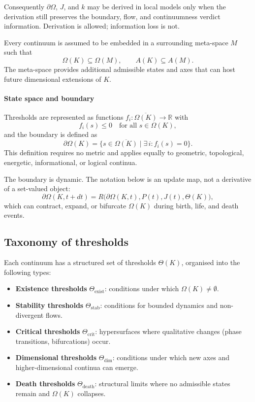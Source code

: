 Consequently \(\partial\Omega\), \(J\), and \(k\) may be derived in local
models only when the derivation still preserves the boundary, flow, and
continuumness verdict information. Derivation is allowed; information loss is
not.

Every continuum is assumed to be embedded in a surrounding meta-space \(M\) such that
\[
    \Omega(K)\subseteq\Omega(M), \qquad A(K)\subseteq A(M).
\]
The meta-space provides additional admissible states and axes that can host future dimensional extensions of \(K\).

\paragraph{State space and boundary}
Thresholds are represented as functions \(f_i : \overline{\Omega(K)} \to \mathbb{R}\) with
\[
    f_i(s) \le 0 \quad\text{for all } s \in \Omega(K),
\]
and the boundary is defined as
\[
    \partial\Omega(K) = \{ s \in \overline{\Omega(K)} \mid \exists\, i: f_i(s) = 0 \}.
\]
This definition requires no metric and applies equally to geometric, topological, energetic, informational, or logical continua.

The boundary is dynamic. The notation below is an update map, not a derivative
of a set-valued object:
\[
    \partial\Omega(K,t+dt) =
    R\big(\partial\Omega(K,t),P(t),J(t),\Theta(K)\big),
\]
which can contract, expand, or bifurcate \(\Omega(K)\) during birth, life, and death events.

\subsection{Taxonomy of thresholds}

Each continuum has a structured set of thresholds \(\Theta(K)\), organised into the following types:

\begin{itemize}
    \item \textbf{Existence thresholds} \(\Theta_{\mathrm{exist}}\): conditions under which \(\Omega(K)\neq\emptyset\).
    \item \textbf{Stability thresholds} \(\Theta_{\mathrm{stab}}\): conditions for bounded dynamics and non-divergent flows.
    \item \textbf{Critical thresholds} \(\Theta_{\mathrm{crit}}\): hypersurfaces where qualitative changes (phase transitions, bifurcations) occur.
    \item \textbf{Dimensional thresholds} \(\Theta_{\mathrm{dim}}\): conditions under which new axes and higher-dimensional continua can emerge.
    \item \textbf{Death thresholds} \(\Theta_{\mathrm{death}}\): structural limits where no admissible states remain and \(\Omega(K)\) collapses.
\end{itemize}

